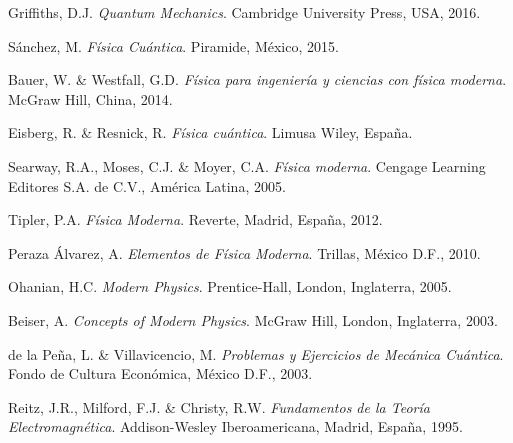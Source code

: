 \documentclass[12pt,a4paper,twoside]{book}
\begin{document}
	\backmatter
	\begin{thebibliography}{99}
		 Griffiths, D.J. \textit{Quantum Mechanics}. Cambridge University Press, USA, 2016.
		
		 Sánchez, M. \textit{Física Cuántica}. Piramide, México, 2015.
		
		 Bauer, W. \& Westfall, G.D. \textit{Física para ingeniería y ciencias con física moderna}. McGraw Hill, China, 2014.
		
		 Eisberg, R. \& Resnick, R. \textit{Física cuántica}. Limusa Wiley, España.
		
		 Searway, R.A., Moses, C.J. \& Moyer, C.A. \textit{Física moderna}. Cengage Learning Editores S.A. de C.V., América Latina, 2005.
		
		 Tipler, P.A. \textit{Física Moderna}. Reverte, Madrid, España, 2012.
		
		 Peraza Álvarez, A. \textit{Elementos de Física Moderna}. Trillas, México D.F., 2010.
		
		 Ohanian, H.C. \textit{Modern Physics}. Prentice-Hall, London, Inglaterra, 2005.
		
		 Beiser, A. \textit{Concepts of Modern Physics}. McGraw Hill, London, Inglaterra, 2003.
		
		 de la Peña, L. \& Villavicencio, M. \textit{Problemas y Ejercicios de Mecánica Cuántica}. Fondo de Cultura Económica, México D.F., 2003.
		
		 Reitz, J.R., Milford, F.J. \& Christy, R.W. \textit{Fundamentos de la Teoría Electromagnética}. Addison-Wesley Iberoamericana, Madrid, España, 1995.
	\end{thebibliography}
	
\end{document}
